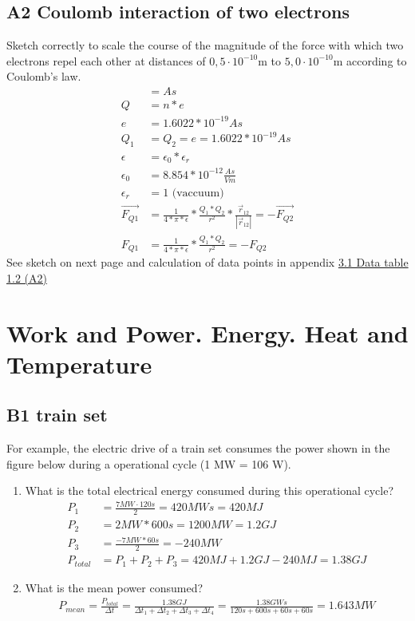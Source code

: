 \documentclass[10pt,ngerman]{scrartcl}
\begin{document}
\subsection{A2 Coulomb interaction of two electrons}
Sketch correctly to scale the course of the magnitude of the force with which two electrons repel each other at distances of $0,5 \cdot 10^{-10}$m to $5,0 \cdot 10^{-10}$m according to Coulomb's law.
\begin{align*}
	[Q] &= As \\
	Q &= n * e \\
	e &= 1.6022 * 10^{-19} As \\
	Q_{1} &= Q_{2} = e = 1.6022 * 10^{-19} As \\
	\epsilon &= \epsilon_{0} * \epsilon_{r} \\
	\epsilon_{0} &= 8.854 * 10^{-12} \frac{As}{Vm} \\
	\epsilon_{r} &= 1 \text{ (vaccuum)}\\
	\vec{F_{Q1}} &= \frac{1}{4 * \pi * \epsilon } * \frac{Q_{1}*Q_{2}}{r^{2}} * \frac{\vec{r}_{12}}{|\vec{r}_{12}|} = -\vec{F_{Q2}} \\
	F_{Q1} &= \frac{1}{4 * \pi * \epsilon } * \frac{Q_{1}*Q_{2}}{r^{2}} = -F_{Q2}
\end{align*}
See sketch on next page and calculation of data points in appendix \hyperref[sec:data-table-a2]{3.1 Data table 1.2 (A2)}

\begin{landscape}
 
\end{landscape}

\newpage
\section{Work and Power. Energy. Heat and Temperature}
\subsection{B1 train set}
For example, the electric drive of a train set consumes the power shown in the figure below during a operational cycle (1 MW = 106 W).

\begin{enumerate}
	\item What is the total electrical energy consumed during this operational cycle?
	\begin{align*}
		P_{1} &= \frac{7MW\cdot 120s}{2} = 420MWs = 420MJ\\
		P_{2} &= 2 MW * 600s = 1200 MW = 1.2 GJ\\
		P_{3} &= \frac{-7MW * 60s}{2} = -240 MW\\
		P_{total} &= P_{1} + P_{2} + P_{3} = 420MJ + 1.2 GJ - 240 MJ = 1.38 GJ
	\end{align*}
	\item What is the mean power consumed?
	\begin{align*}
        P_{mean} = \frac{P_{total}}{\Delta t} = \frac{1.38 GJ}{\Delta t_{1} +\Delta t_{2} +\Delta t_{3} +\Delta t_{4}}
		= \frac{1.38GWs}{120s + 600s + 60s + 60s} = 1.643MW
  \end{align*}
\end{enumerate}
\end{document}
